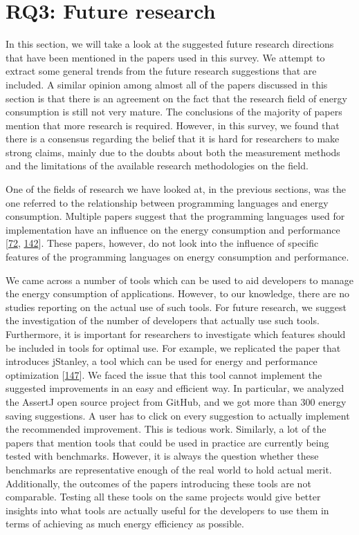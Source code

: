\documentclass[]{book}
\begin{document}
\section{RQ3: Future research}\label{rq3-future-research-1}

In this section, we will take a look at the suggested future research
directions that have been mentioned in the papers used in this survey.
We attempt to extract some general trends from the future research
suggestions that are included. A similar opinion among almost all of the
papers discussed in this section is that there is an agreement on the
fact that the research field of energy consumption is still not very
mature. The conclusions of the majority of papers mention that more
research is required. However, in this survey, we found that there is a
consensus regarding the belief that it is hard for researchers to make
strong claims, mainly due to the doubts about both the measurement
methods and the limitations of the available research methodologies on
the field.

One of the fields of research we have looked at, in the previous
sections, was the one referred to the relationship between programming
languages and energy consumption. Multiple papers suggest that the
programming languages used for implementation have an influence on the
energy consumption and performance
{[}\protect\hyperlink{ref-GKLS2018}{72},
\protect\hyperlink{ref-OOC2017}{142}{]}. These papers, however, do not
look into the influence of specific features of the programming
languages on energy consumption and performance.

We came across a number of tools which can be used to aid developers to
manage the energy consumption of applications. However, to our
knowledge, there are no studies reporting on the actual use of such
tools. For future research, we suggest the investigation of the number
of developers that actually use such tools. Furthermore, it is important
for researchers to investigate which features should be included in
tools for optimal use. For example, we replicated the paper that
introduces jStanley, a tool which can be used for energy and performance
optimization {[}\protect\hyperlink{ref-PSCS2018}{147}{]}. We faced the
issue that this tool cannot implement the suggested improvements in an
easy and efficient way. In particular, we analyzed the AssertJ open
source project from GitHub, and we got more than 300 energy saving
suggestions. A user has to click on every suggestion to actually
implement the recommended improvement. This is tedious work. Similarly,
a lot of the papers that mention tools that could be used in practice
are currently being tested with benchmarks. However, it is always the
question whether these benchmarks are representative enough of the real
world to hold actual merit. Additionally, the outcomes of the papers
introducing these tools are not comparable. Testing all these tools on
the same projects would give better insights into what tools are
actually useful for the developers to use them in terms of achieving as
much energy efficiency as possible.
\end{document}
